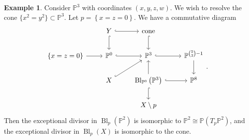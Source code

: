\documentclass[10pt,letterpaper,cm]{nupset}
\theoremstyle{definition}
\newtheorem{exmp}[defn]{Example}
\theoremstyle{theorem}
\theoremstyle{remark}
\renewcommand{\P}{\mathbb P}
\newcommand{\1}{\mathbb{1}}
\newcommand{\0}{\vec 0}
\DeclareMathOperator{\bl}{\mathrm{Bl}}
\begin{document}
\begin{exmp}
Consider $\P^3$ with coordinates $\left(x,y,z,w\right)$. We wish to resolve the cone $\{x^2 = y^2\} \subset \P^3$. Let $p = \left\{x=z=0\right\}$.
We have a commutative diagram
\[
\begin{tikzcd}
                    & Y \arrow[d, hook] \arrow[r, hook] & \text{cone} \arrow[d, hook]                                           &                               \\
\{x=z=0\} \arrow[r] & \P^0 \arrow[r, hook]              & \P^3 \arrow[r, hook]                                                  & \P^{{5\choose 2}-1} \arrow[d] \\
                    & X \arrow[ru, hook]                & \bl_{\P^0}\left(\P^3\right) \arrow[r, hook] \arrow[d, hook] \arrow[u] & \P^8                          \\
                    &                                   & X\setminus p                                                          &                              
\end{tikzcd}
.\] Then the exceptional divisor in $\bl_p\left(\P^2\right)$ is isomorphic to $\P^2 \cong \P\left(T_p{\P^2}\right)$, and the exceptional divisor in $\bl_p(X)$ is isomorphic to the cone.
\end{exmp}
\end{document}
